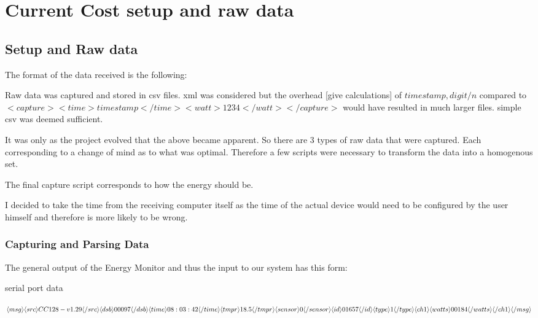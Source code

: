 \chapter{Current Cost setup and raw data}

\section{Setup and Raw data}

The format of the data received is the following:


Raw data was captured and stored in csv files. xml was considered but the overhead [give calculations] of $timestamp,digit/n$ compared to $<capture><time>timestamp</time><watt>1234</watt></capture>$ would have resulted in much larger files. simple csv was deemed sufficient.

It was only as the project evolved that the above became apparent. So there are 3 types of raw data that were captured. Each corresponding to a change of mind as to what was optimal. Therefore a few scripts were necessary to transform the data into a homogenous set.

The final capture script corresponds to how the energy should be.

I decided to take the time from the receiving computer itself as the time of the actual device would need to be configured by the user himself and therefore is more likely to be wrong.
\subsection{Capturing and Parsing Data}

The general output of the Energy Monitor and thus the input to our system has this form:

serial port data

$
\langle msg \rangle \\
\langle src\rangle CC128-v1.29\langle /src \rangle \\
\langle dsb \rangle00097\langle /dsb \rangle \\
\langle time \rangle 08:03:42 \langle /time \rangle \\
\langle tmpr \rangle 18.5 \langle /tmpr \rangle \\
\langle sensor \rangle 0 \langle /sensor \rangle \\
\langle id \rangle 01657 \langle /id \rangle \\
\langle type \rangle 1 \langle /type \rangle \\
\langle ch1 \rangle\langle watts \rangle 00184 \langle /watts \rangle \langle /ch1 \rangle \\
\langle /msg \rangle \\
$

